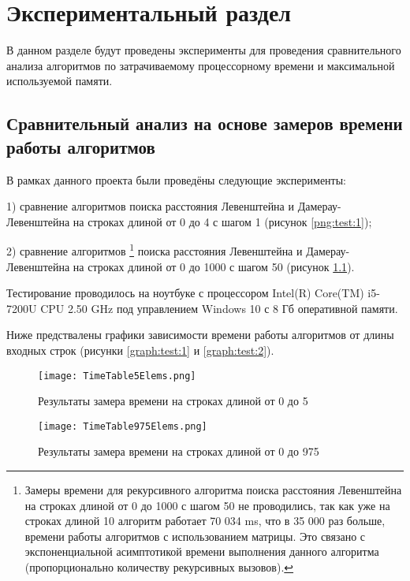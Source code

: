 \chapter{Экспериментальный раздел}
\label{cha:research}
    В данном разделе будут проведены эксперименты для проведения 
    сравнительного анализа алгоритмов по затрачиваемому процессорному 
    времени\cite{CPU-time} и максимальной используемой памяти.
    \section{Сравнительный анализ на основе замеров времени работы алгоритмов}
        В рамках данного проекта были проведёны следующие эксперименты:

        1) сравнение алгоритмов поиска расстояния Левенштейна и Дамерау-Левенштейна
        на строках длиной от 0 до 4 с шагом 1 (рисунок \ref{png:test:1});
        
        2) сравнение алгоритмов \footnote{Замеры времени для рекурсивного алгоритма поиска расстояния Левенштейна
        на строках длиной от 0 до 1000 с шагом 50 не проводились, так как уже на 
        строках длиной 10 алгоритм работает 70 034 ms, что в 35 000 раз больше, 
        времени работы алгоритмов с использованием матрицы. Это связано с экспоненциальной асимптотикой
        времени выполнения данного алгоритма (пропорционально количеству
        рекурсивных вызовов).} поиска расстояния Левенштейна и Дамерау-Левенштейна
        на строках длиной от 0 до 1000 с шагом 50 (рисунок \ref{png:test:2}).
        
        Тестирование проводилось на ноутбуке с процессором
        Intel(R) Core(TM) i5-7200U CPU 2.50 GHz \cite{processor-i5-7200u}
        под управлением Windows 10 с 8 Гб оперативной памяти.

        Ниже предствалены графики зависимости времени работы алгоритмов от длины входных строк
        (рисунки \ref{graph:test:1} и \ref{graph:test:2}).

        \begin{figure}[h!]
            \centering
            \texttt{[image: TimeTable5Elems.png]}
            \caption{Результаты замера времени на строках длиной от 0 до 5}
            \label{png:test:1}
        
            \texttt{[image: TimeTable975Elems.png]}
            \caption{Результаты замера времени на строках длиной от 0 до 975}
            \label{png:test:2}
        \end{figure}

